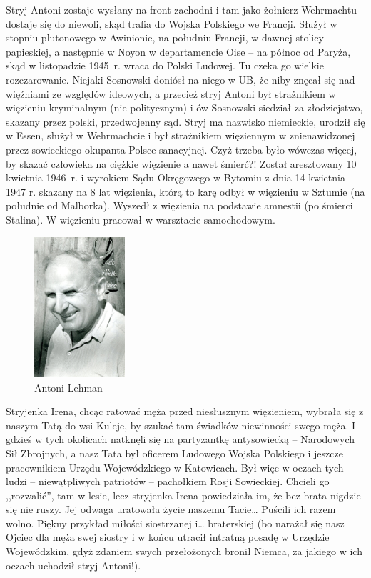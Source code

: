 Stryj Antoni zostaje wysłany na front zachodni i tam jako żołnierz Wehrmachtu dostaje się do niewoli, skąd trafia do Wojska Polskiego we Francji. Służył w stopniu plutonowego w Awinionie, na południu Francji, w dawnej stolicy papieskiej, a następnie w Noyon w departamencie Oise -- na północ od Paryża, skąd w listopadzie 1945~r. wraca do Polski Ludowej. Tu czeka go wielkie rozczarowanie. Niejaki Sosnowski doniósł na niego w UB, że niby znęcał się nad więźniami ze względów ideowych, a przecież stryj Antoni był strażnikiem w więzieniu kryminalnym (nie politycznym) i ów Sosnowski siedział za złodziejstwo, skazany przez polski, przedwojenny sąd. Stryj ma nazwisko niemieckie, urodził się w Essen, służył w Wehrmachcie i był strażnikiem więziennym w znienawidzonej przez sowieckiego okupanta Polsce sanacyjnej. Czyż trzeba było wówczas więcej, by skazać człowieka na ciężkie więzienie a nawet śmierć?! Został aresztowany 10 kwietnia 1946~r. i wyrokiem Sądu Okręgowego w Bytomiu z dnia 14 kwietnia 1947 r. skazany na 8 lat więzienia, którą to karę odbył w więzieniu w Sztumie (na południe od Malborka). Wyszedł z więzienia na podstawie amnestii (po śmierci Stalina). W więzieniu pracował w warsztacie samochodowym.

\begin{figure}[!h]
\begin{center}
\includegraphics[width=0.3\textwidth]{photo/antoni_lehman_1.jpg}
\caption{Antoni Lehman}
\label{rys:antoni_lehman_1}
\end{center}
\end{figure}

Stryjenka Irena, chcąc ratować męża przed niesłusznym więzieniem, wybrała się z naszym Tatą do wsi Kuleje, by szukać tam świadków niewinności swego męża. I gdzieś w tych okolicach natknęli się na partyzantkę antysowiecką -- Narodowych Sił Zbrojnych, a nasz Tata był oficerem Ludowego Wojska Polskiego i jeszcze pracownikiem Urzędu Wojewódzkiego w Katowicach. Był więc w oczach tych ludzi -- niewątpliwych patriotów -- pachołkiem Rosji Sowieckiej. Chcieli go ,,rozwalić'', tam w lesie, lecz stryjenka Irena powiedziała im, że bez brata nigdzie się nie ruszy. Jej odwaga uratowała życie naszemu Tacie… Puścili ich razem wolno. Piękny przykład miłości siostrzanej i… braterskiej (bo narażał się nasz Ojciec dla męża swej siostry i w końcu utracił intratną posadę w Urzędzie Wojewódzkim, gdyż zdaniem swych przełożonych bronił Niemca, za jakiego w ich oczach uchodził stryj Antoni!).

